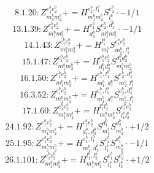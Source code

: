 \documentclass[letterpaper,10pt,fleqn,leqno,onecolumn]{article}
\begin{document}
\begin{equation} \;\;\;\;\;\;  8.1.20: Z^{e_{1}^{b}e_{2}^{b}}_{m_{1}^{b}m_{2}^{b}}+=H^{e_{1}^{b},l_{1}^{b}}_{m_{1}^{b}m_{2}^{b}}S^{e_{2}^{b}}_{l_{1}^{b}}\cdot -1/1 \end{equation}
\begin{equation} \;\;\;\;\;\;  13.1.39: Z^{e_{1}^{b}e_{2}^{b}}_{m_{1}^{b}m_{2}^{b}}+=H^{e_{1}^{b}}_{d_{1}^{b}}S^{e_{2}^{b},d_{1}^{b}}_{m_{1}^{b}m_{2}^{b}}\cdot -1/1 \end{equation}
\begin{equation} \;\;\;\;\;\;  14.1.43: Z^{e_{1}^{b}e_{2}^{b}}_{m_{1}^{b}m_{2}^{b}}+=H^{l_{1}^{b}}_{m_{1}^{b}}S^{e_{1}^{b}e_{2}^{b}}_{m_{2}^{b},l_{1}^{b}} \end{equation}
\begin{equation} \;\;\;\;\;\;  15.1.47: Z^{e_{1}^{b}e_{2}^{b}}_{m_{1}^{b}m_{2}^{b}}+=H^{e_{1}^{b}e_{2}^{b}}_{d_{1}^{b}d_{2}^{b}}S^{d_{1}^{b}d_{2}^{b}}_{m_{1}^{b}m_{2}^{b}} \end{equation}
\begin{equation} \;\;\;\;\;\;  16.1.50: Z^{e_{1}^{b}e_{2}^{b}}_{m_{1}^{b}m_{2}^{b}}+=H^{e_{1}^{b},l_{1}^{b}}_{m_{1}^{b},d_{1}^{b}}S^{e_{2}^{b},d_{1}^{b}}_{m_{2}^{b},l_{1}^{b}} \end{equation}
\begin{equation} \;\;\;\;\;\;  16.3.52: Z^{e_{1}^{b}e_{2}^{b}}_{m_{1}^{b}m_{2}^{b}}+=H^{e_{1}^{b},l_{1}^{a}}_{m_{1}^{b},d_{1}^{a}}S^{e_{2}^{b},d_{1}^{a}}_{m_{2}^{b},l_{1}^{a}} \end{equation}
\begin{equation} \;\;\;\;\;\;  17.1.60: Z^{e_{1}^{b}e_{2}^{b}}_{m_{1}^{b}m_{2}^{b}}+=H^{l_{1}^{b}l_{2}^{b}}_{m_{1}^{b}m_{2}^{b}}S^{e_{1}^{b}e_{2}^{b}}_{l_{1}^{b}l_{2}^{b}} \end{equation}
\begin{equation} \;\;\;\;\;\;  24.1.92: Z^{e_{1}^{b}e_{2}^{b}}_{m_{1}^{b}m_{2}^{b}}+=H^{e_{1}^{b}e_{2}^{b}}_{d_{1}^{b},d_{2}^{b}}S^{d_{1}^{b}}_{m_{1}^{b}}S^{d_{2}^{b}}_{m_{2}^{b}}\cdot +1/2 \end{equation}
\begin{equation} \;\;\;\;\;\;  25.1.95: Z^{e_{1}^{b}e_{2}^{b}}_{m_{1}^{b}m_{2}^{b}}+=H^{e_{1}^{b},l_{1}^{b}}_{m_{1}^{b},d_{1}^{b}}S^{e_{2}^{b}}_{l_{1}^{b}}S^{d_{1}^{b}}_{m_{2}^{b}}\cdot -1/1 \end{equation}
\begin{equation} \;\;\;\;\;\;  26.1.101: Z^{e_{1}^{b}e_{2}^{b}}_{m_{1}^{b}m_{2}^{b}}+=H^{l_{1}^{b},l_{2}^{b}}_{m_{1}^{b}m_{2}^{b}}S^{e_{1}^{b}}_{l_{1}^{b}}S^{e_{2}^{b}}_{l_{2}^{b}}\cdot +1/2 \end{equation}
\end{document}
